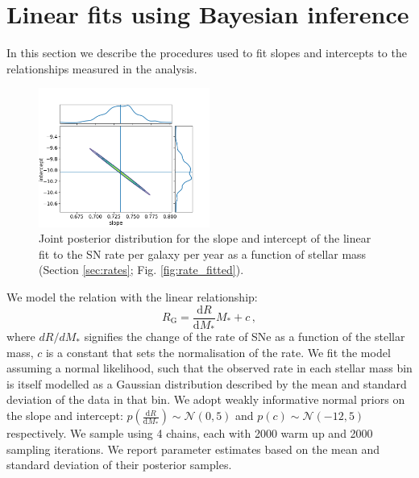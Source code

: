 \documentclass[fleqn,usenatbib]{mnras}
\begin{document}


\appendix

\section{Linear fits using Bayesian inference}
In this section we describe the procedures used to fit slopes and intercepts to the relationships measured in the analysis.

\label{appendix:linear_fits}

\begin{figure}
    \centering
    \includegraphics[width=0.5\textwidth]{figs/fit_fine_BC03_corner.png}
    \caption{Joint posterior distribution for the slope and intercept of the linear fit to the SN rate per galaxy per year as a function of stellar mass (Section \ref{sec:rates}; Fig. \ref{fig:rate_fitted}).}
    \label{fig:corner_slope_int}
\end{figure}
We model the relation with the linear relationship: 
\begin{equation}
    R_{\mathrm{G}} = \frac{\mathrm{d}R}{\mathrm{d}M_*} M_* + c \,,
\label{eq:rate_fit}
\end{equation}
where $dR/dM_*$ signifies the change of the rate of SNe as a function of the stellar mass, $c$ is a constant that sets the normalisation of the rate. We fit the model assuming a normal likelihood, such that the observed rate in each stellar mass bin is itself modelled as a Gaussian distribution described by the mean and standard deviation of the data in that bin. We adopt weakly informative normal priors on the slope and intercept: $p\left(\frac{\mathrm{d}R}{\mathrm{d}M_*}\right) \sim \mathcal{N}\left(0,5\right)$ and  $p\left(c\right) \sim \mathcal{N}\left(-12,5\right)$ respectively. We sample using 4 chains, each with 2000 warm up and 2000 sampling iterations. We report parameter estimates based on the mean and standard deviation of their posterior samples.
\end{document}

